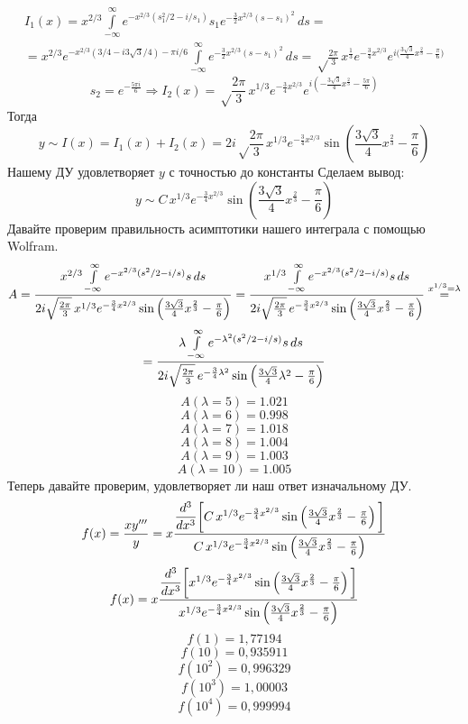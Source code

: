 	\begin{multline*}
		I_1(x)=x^{2/3}\int\limits_{-\infty}^\infty e^{-x^{2/3}(s_1^2/2-i/s_1)}s_1e^{-\frac{3}{2}x^{2/3}(s-s_1)^2}\,ds=\\= x^{2/3}e^{-x^{2/3}(3/4-i3\sqrt3/4)-\pi i/6}\int\limits_{-\infty}^\infty e^{-\frac{3}{2}x^{2/3}(s-s_1)^2}\,ds=\sqrt\frac{2\pi}{3}\,x^\frac{1}{3}e^{-\frac{3}{4}x^{2/3}}e^{i\big(\frac{3\sqrt3}{4}x^\frac{2}{3}-\frac{\pi}{6}\big)}
	\end{multline*}
	$$s_2=e^{-\frac{5\pi i}{6}}\Rightarrow I_2(x)=\sqrt\frac{2\pi}{3}\,x^{1/3}e^{-\frac{3}{4}x^{2/3}}e^{i\left (-\frac{3\sqrt3}{4}x^\frac{2}{3}-\frac{5\pi}{6} \right )}$$
	Тогда
	$$y\sim I(x)=I_1(x)+I_2(x)=2i\sqrt\frac{2\pi}{3}\,x^{1/3}e^{-\frac{3}{4}x^{2/3}}\sin \left (\frac{3\sqrt3}{4}x^\frac{2}{3}-\frac{\pi}{6} \right )$$
	Нашему ДУ удовлетворяет $y$ с точностью до константы
	\newline
	Сделаем вывод:
	$$y\sim C\,x^{1/3}e^{-\frac{3}{4}x^{2/3}} \sin \left (\frac{3\sqrt3}{4}x^\frac{2}{3}-\frac{\pi}{6} \right )$$
	Давайте проверим правильность асимптотики нашего интеграла с помощью Wolfram.
	$$A = \frac{x^{2/3}\int\limits\limits_{-\infty}^\infty e^{-x^{2/3}(s^2/2-i/s)}s\,ds}{2i\sqrt\frac{2\pi}{3}\,x^{1/3}e^{-\frac{3}{4}x^{2/3}} \sin \left (\frac{3\sqrt3}{4}x^\frac{2}{3}-\frac{\pi}{6} \right )} = \frac{x^{1/3}\int\limits\limits_{-\infty}^\infty e^{-x^{2/3}(s^2/2-i/s)}s\,ds}{2i\sqrt\frac{2\pi}{3}\,e^{-\frac{3}{4}x^{2/3}} \sin \left (\frac{3\sqrt3}{4}x^\frac{2}{3}-\frac{\pi}{6} \right )}   \overset{x^{1/3} = \lambda}{=}$$
	$$= \frac{\lambda\int\limits\limits_{-\infty}^\infty e^{-\lambda^2(s^2/2-i/s)}s\,ds}{2i\sqrt\frac{2\pi}{3}\,e^{-\frac{3}{4}\lambda^2} \sin \left (\frac{3\sqrt3}{4}\lambda^2-\frac{\pi}{6} \right )}$$
	$$A(\lambda = 5) = 1.021 $$
	$$A(\lambda = 6) = 0.998 $$
	$$A(\lambda = 7) = 1.018 $$
	$$A(\lambda = 8) = 1.004 $$
	$$A(\lambda = 9) = 1.003 $$
	$$A(\lambda = 10) = 1.005 $$
	Теперь давайте проверим, удовлетворяет ли наш ответ изначальному ДУ.
	$$f(x) = \frac{x y'''}{y} = x \frac{\dfrac{d^3}{dx^3} \bigg{[}C\,x^{1/3}e^{-\frac{3}{4}x^{2/3}} \sin \left (\frac{3\sqrt3}{4}x^\frac{2}{3}-\frac{\pi}{6} \right ) \bigg{]}}{C\,x^{1/3}e^{-\frac{3}{4}x^{2/3}} \sin \left (\frac{3\sqrt3}{4}x^\frac{2}{3}-\frac{\pi}{6} \right )}$$
	$$f(x) =  x \frac{\dfrac{d^3}{dx^3} \bigg{[}x^{1/3}e^{-\frac{3}{4}x^{2/3}} \sin \left (\frac{3\sqrt3}{4}x^\frac{2}{3}-\frac{\pi}{6} \right ) \bigg{]}}{x^{1/3}e^{-\frac{3}{4}x^{2/3}} \sin \left (\frac{3\sqrt3}{4}x^\frac{2}{3}-\frac{\pi}{6} \right )}$$
	$$f(1) = 1,77194$$
	$$f(10) = 0,935911$$
	$$f(10^2) = 0,996329$$
	$$f(10^3) = 1,00003$$
	$$f(10^4) = 0,999994$$

